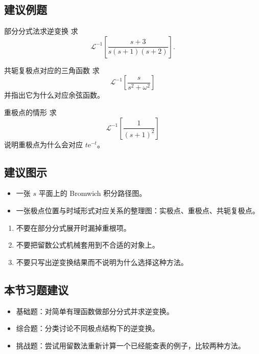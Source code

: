 \subsection*{建议例题}
\begin{lizi}{部分分式法求逆变换}{}
求
\[
    \mathcal{L}^{-1}\left[\frac{s+3}{s(s+1)(s+2)}\right].
\]
\end{lizi}

\begin{lizi}{共轭复极点对应的三角函数}{}
求
\[
    \mathcal{L}^{-1}\left[\frac{s}{s^2+\omega^2}\right]
\]
并指出它为什么对应余弦函数。
\end{lizi}

\begin{lizi}{重极点的情形}{}
求
\[
    \mathcal{L}^{-1}\left[\frac{1}{(s+1)^2}\right]
\]
说明重极点为什么会对应 $t\mathrm{e}^{-t}$。
\end{lizi}

\subsection*{建议图示}
\begin{itemize}
    \item 一张 $s$ 平面上的 Bromwich 积分路径图。
    \item 一张极点位置与时域形式对应关系的整理图：实极点、重极点、共轭复极点。
\end{itemize}

\begin{jinshi}[本节易错点]
\begin{enumerate}
    \item 不要在部分分式展开时漏掉重根项。
    \item 不要把留数公式机械套用到不合适的对象上。
    \item 不要只写出逆变换结果而不说明为什么选择这种方法。
\end{enumerate}
\end{jinshi}

\subsection*{本节习题建议}
\begin{itemize}
    \item 基础题：对简单有理函数做部分分式并求逆变换。
    \item 综合题：分类讨论不同极点结构下的逆变换。
    \item 挑战题：尝试用留数法重新计算一个已经能查表的例子，比较两种方法。
\end{itemize}

